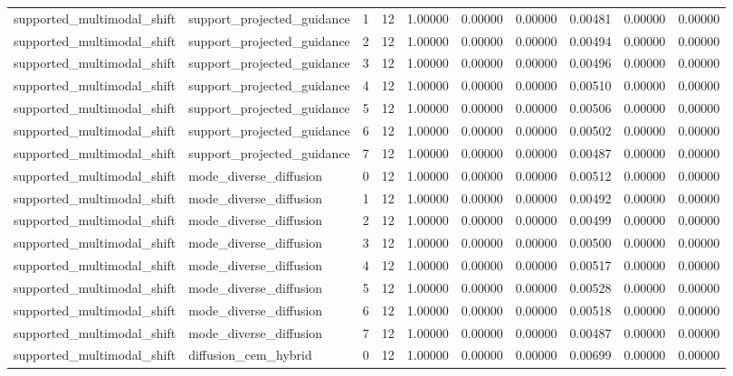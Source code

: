 \documentclass{article}
\begin{document}
\begin{table}[tbp]
{\begin{tabular}{llllllllll}
supported\_multimodal\_shift & support\_projected\_guidance & 1 & 12 & 1.00000 & 0.00000 & 0.00000 & 0.00481 & 0.00000 & 0.00000 \\
supported\_multimodal\_shift & support\_projected\_guidance & 2 & 12 & 1.00000 & 0.00000 & 0.00000 & 0.00494 & 0.00000 & 0.00000 \\
supported\_multimodal\_shift & support\_projected\_guidance & 3 & 12 & 1.00000 & 0.00000 & 0.00000 & 0.00496 & 0.00000 & 0.00000 \\
supported\_multimodal\_shift & support\_projected\_guidance & 4 & 12 & 1.00000 & 0.00000 & 0.00000 & 0.00510 & 0.00000 & 0.00000 \\
supported\_multimodal\_shift & support\_projected\_guidance & 5 & 12 & 1.00000 & 0.00000 & 0.00000 & 0.00506 & 0.00000 & 0.00000 \\
supported\_multimodal\_shift & support\_projected\_guidance & 6 & 12 & 1.00000 & 0.00000 & 0.00000 & 0.00502 & 0.00000 & 0.00000 \\
supported\_multimodal\_shift & support\_projected\_guidance & 7 & 12 & 1.00000 & 0.00000 & 0.00000 & 0.00487 & 0.00000 & 0.00000 \\
supported\_multimodal\_shift & mode\_diverse\_diffusion & 0 & 12 & 1.00000 & 0.00000 & 0.00000 & 0.00512 & 0.00000 & 0.00000 \\
supported\_multimodal\_shift & mode\_diverse\_diffusion & 1 & 12 & 1.00000 & 0.00000 & 0.00000 & 0.00492 & 0.00000 & 0.00000 \\
supported\_multimodal\_shift & mode\_diverse\_diffusion & 2 & 12 & 1.00000 & 0.00000 & 0.00000 & 0.00499 & 0.00000 & 0.00000 \\
supported\_multimodal\_shift & mode\_diverse\_diffusion & 3 & 12 & 1.00000 & 0.00000 & 0.00000 & 0.00500 & 0.00000 & 0.00000 \\
supported\_multimodal\_shift & mode\_diverse\_diffusion & 4 & 12 & 1.00000 & 0.00000 & 0.00000 & 0.00517 & 0.00000 & 0.00000 \\
supported\_multimodal\_shift & mode\_diverse\_diffusion & 5 & 12 & 1.00000 & 0.00000 & 0.00000 & 0.00528 & 0.00000 & 0.00000 \\
supported\_multimodal\_shift & mode\_diverse\_diffusion & 6 & 12 & 1.00000 & 0.00000 & 0.00000 & 0.00518 & 0.00000 & 0.00000 \\
supported\_multimodal\_shift & mode\_diverse\_diffusion & 7 & 12 & 1.00000 & 0.00000 & 0.00000 & 0.00487 & 0.00000 & 0.00000 \\
supported\_multimodal\_shift & diffusion\_cem\_hybrid & 0 & 12 & 1.00000 & 0.00000 & 0.00000 & 0.00699 & 0.00000 & 0.00000 \\

\end{tabular}}
\end{table}
\end{document}
